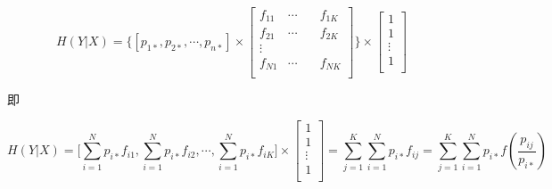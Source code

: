 \begin{remark}
    \begin{equation*}
        H(Y|X) = \Bigg\{ [p_{1*}, p_{2*},\cdots, p_{n*}] \times
        \left[
            \begin{aligned}
                f_{11} & \cdots & \quad f_{1K} \\
                f_{21} & \cdots & \quad f_{2K} \\
                \vdots                         \\
                f_{N1} & \cdots & \quad f_{NK} \\
            \end{aligned}
            \right] \Bigg\} \times
        \left[
            \begin{aligned}
                1      \\
                1      \\
                \vdots \\
                1      \\
            \end{aligned}
            \right]
    \end{equation*}

    即

    \begin{equation*}
        H(Y|X) = \Big[\sum_{i=1}^Np_{i*}f_{i1}, \sum_{i=1}^Np_{i*}f_{i2}, \cdots, \sum_{i=1}^Np_{i*}f_{iK}\Big] \times
        \left[
            \begin{aligned}
                1      \\
                1      \\
                \vdots \\
                1      \\
            \end{aligned}
            \right]
        = \sum_{j=1}^K\sum_{i=1}^Np_{i*}f_{ij} = \sum_{j=1}^K\sum_{i=1}^Np_{i*}f(\frac{p_{ij}}{p_{i*}})
    \end{equation*}

\end{remark}

